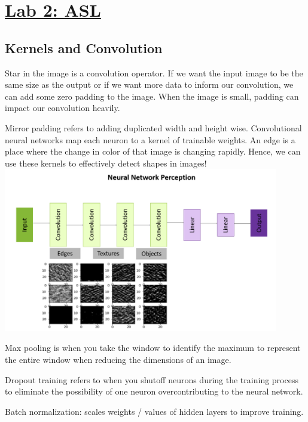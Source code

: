 \documentclass{article}
\begin{document}
\section{\href{http://dli-e5d62e622240-a8611b.westus3.cloudapp.azure.com/lab/lab/tree/02_asl.ipynb}{Lab 2: ASL}}
\subsection{Kernels and Convolution}
Star in the image is a convolution operator. If we want the input image to be the same size as the output or if we want more data to inform our convolution, we can add some zero padding to the image. When the image is small, padding can impact our convolution heavily. 

Mirror padding refers to adding duplicated width and height wise. Convolutional neural networks map each neuron to a kernel of trainable weights. An edge is a place where the change in color of that image is changing rapidly. Hence, we can use these kernels to effectively detect shapes in images!\\\includegraphics[width=0.9\textwidth]{../images/nnp_arch.png}

Max pooling is when you take the window to identify the maximum to represent the entire window when reducing the dimensions of an image. 

Dropout training refers to when you shutoff neurons during the training process to eliminate the possibility of one neuron overcontributing to the neural network. 

Batch normalization: scales weights / values of hidden layers to improve training. 
\end{document}
